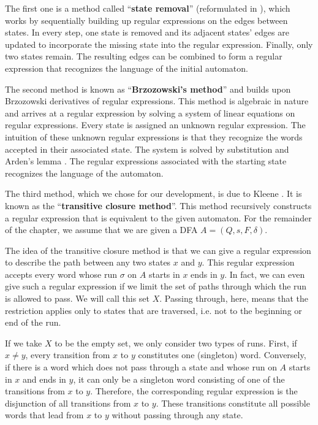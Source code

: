 The first one is a method called ``\textbf{state removal}'' \cite{SignalFlow} (reformulated in \cite{springerlink:10.1007/978-3-540-30500-2}),
which works by sequentially building up regular expressions on the edges between states. 
In every step, one state is removed and its adjacent states' edges are updated to incorporate the missing state into the regular expression.
Finally, only two states remain. The resulting edges can be combined to form a regular expression that recognizes the language of the initial automaton.


The second method is known as ``\textbf{Brzozowski's method}'' \cite{DBLP:journals/jacm/Brzozowski64} and builds upon Brzozowski derivatives of regular expressions.
This method is algebraic in nature and arrives at a regular expression by solving a system of linear equations on regular expressions. 
Every state is assigned an unknown regular expression. 
The intuition of these unknown regular expressions is that they recognize the words accepted in their associated state. 
The system is solved by substitution and Arden's lemma \cite{DBLP:conf/focs/Arden61}.
The regular expressions associated with the starting state recognizes the language of the automaton.


The third method, which we chose for our development, is due to Kleene \cite{KleeneNets}.
It is known as the ``\textbf{transitive closure method}''.
This method recursively constructs a regular expression that is equivalent to the given automaton.
For the remainder of the chapter, we assume that we are given a DFA $A=(Q,s,F,\delta)$.


The idea of the transitive closure method is that we can give a regular expression to describe the path between any two states $x$ and $y$.
This regular expression accepts every word whose run $\sigma$ on $A$ starts in $x$ ends in $y$.
In fact, we can even give such a regular expression if we limit the set of paths through which the run is allowed to pass. 
We will call this set $X$.
Passing through, here, means that the restriction applies only to states that are traversed, 
i.e. not to the beginning or end of the run.


If we take $X$ to be the empty set, we only consider two types of runs.
First, if $x \neq y$, every transition from $x$ to $y$ constitutes one (singleton) word. 
Conversely, if there is a word which does not pass through a state and whose run on $A$ starts in $x$ and ends in $y$, 
it can only be a singleton word consisting of one of the transitions from $x$ to $y$.
Therefore, the corresponding regular expression is the disjunction of all transitions from $x$ to $y$. 
These transitions constitute all possible words that lead from $x$ to $y$ without passing through any state.

